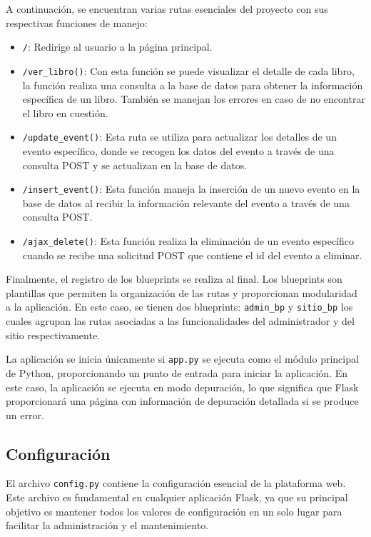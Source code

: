 \documentclass[a4paper, 12pt]{book}
\begin{document}
A continuación, se encuentran varias rutas esenciales del proyecto con sus respectivas funciones de manejo:

\begin{itemize}
   \item \texttt{/}: Redirige al usuario a la página principal.
   \item \texttt{/ver\_libro()}: Con esta función se puede visualizar el detalle de cada libro, la función realiza una consulta a la base de datos para obtener la 
   información específica de un libro. También se manejan los errores en caso de no encontrar el libro en cuestión.
   \item \texttt{/update\_event()}: Esta ruta se utiliza para actualizar los detalles de un evento específico, donde se recogen los datos del evento a través de una 
   consulta POST y se actualizan en la base de datos.
   \item \texttt{/insert\_event()}: Esta función maneja la inserción de un nuevo evento en la base de datos al recibir la información relevante del evento a través de una consulta POST.
   \item \texttt{/ajax\_delete()}: Esta función realiza la eliminación de un evento específico cuando se recibe una solicitud POST que contiene el id del evento a eliminar.
\end{itemize}

Finalmente, el registro de los blueprints se realiza al final. Los blueprints son plantillas que permiten la organización de las rutas y proporcionan modularidad a la 
aplicación. En este caso, se tienen dos blueprints: \texttt{admin\_bp} y \texttt{sitio\_bp} los cuales agrupan las rutas asociadas a las funcionalidades del administrador 
y del sitio respectivamente.

La aplicación se inicia únicamente si \texttt{app.py} se ejecuta como el módulo principal de Python, proporcionando un punto de entrada para iniciar la aplicación. 
En este caso, la aplicación se ejecuta en modo depuración, lo que significa que Flask proporcionará una página con información de depuración detallada si se produce un error.

\subsection{Configuración}
\label{subsec:configuración}

El archivo \texttt{config.py} contiene la configuración esencial de la plataforma web. Este archivo es fundamental en cualquier aplicación Flask, ya que su principal objetivo 
es mantener todos los valores de configuración en un solo lugar para facilitar la administración y el mantenimiento.
\end{document}
